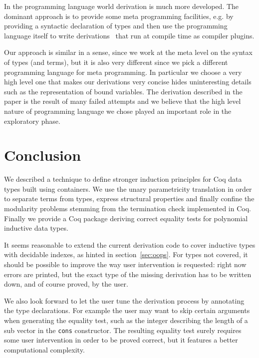 \documentclass[sigplan,10pt,review]{acmart}\settopmatter{printfolios=true,printccs=false,printacmref=false}
\begin{document}
In the programming language world derivation is much more developed.
The dominant approach is to provide some meta programming facilities,
e.g. by providing a syntactic declaration of types and then use the
programming language itself to write 
derivations~\cite{Sheard:2002:TMH:636517.636528} that run at compile
time as compiler plugins. 

Our approach is similar in a sense, since we work at the meta level on
the syntax of types (and terms), but it is also very different since
we pick a different programming language for meta programming.  In
particular we choose a very high level one that makes our derivations
very concise hides uninteresting details such as the
representation of bound variables.
The derivation described in the paper is the result of many failed
attempts and we believe that the high level nature of programming
language we chose played an important role in the exploratory phase.

\section{Conclusion} %
\label{sec:conclusion}

We described a technique to define stronger induction principles
for Coq data types built using containers. We use the unary
parametricity translation in order to separate terms from types,
express structural properties and finally confine the modularity
problems stemming from the termination check implemented in Coq.
Finally we provide a Coq package deriving correct equality tests
for polynomial inductive data types.

It seems reasonable to extend the current derivation code to cover
inductive types with decidable indexes, as hinted in
section~\ref{sec:oops}. For types not covered, it should be possible
to improve the way user intervention is requested: right now errors
are printed, but the exact type of the missing derivation
has to be written down, and of course proved, by the user.

We also look forward to let the user tune
the derivation process by annotating the type declarations.
For example the user may want to skip
certain arguments when generating the equality test, such as the
integer describing the length of a sub vector in the \lstinline+cons+
constructor. The resulting equality
test surely requires some user intervention in order 
to be proved correct, but it features a better computational complexity.
\end{document}
